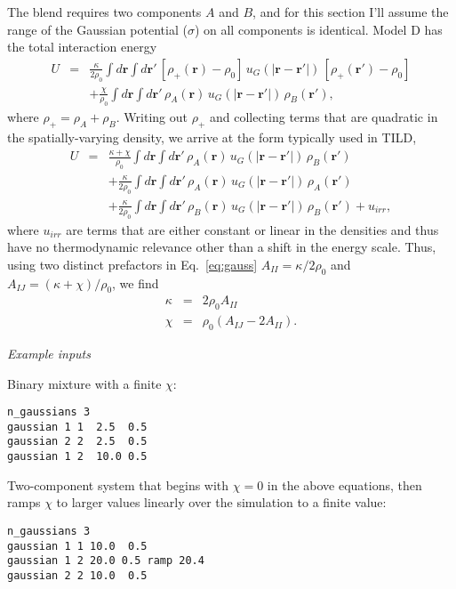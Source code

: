 \documentclass[12pt]{article}
\newcommand{\mb}{\mathbf}
\begin{document}
The blend requires two components $A$ and $B$, and for this section I'll assume the range of the Gaussian potential ($\sigma$) on all components is identical. Model D has the total interaction energy
\begin{eqnarray}
	U
	&=&
	\frac{\kappa}{2\rho_0}
	\int d \mb r
	\int d \mb r'
	\,
	[\rho_+(\mb r)-\rho_0] \, 
	u_G(|\mb r- \mb r'|)
	\,
	[\rho_+(\mb r')-\rho_0]
	\\
	\nonumber
	&&
	+
	\frac{ \chi } { \rho_0 }
	\int d\mb r
	\int d\mb r'
	\,
	\rho_A(\mb r)
	\,
	u_G(|\mb r - \mb r'|)
	\,
	\rho_B(\mb r'),
\end{eqnarray}
where $\rho_+ = \rho_A + \rho_B$. Writing out $\rho_+$ and collecting terms that are quadratic in the spatially-varying density, we arrive at the form typically used in TILD,
\begin{eqnarray}
	U &=&
	\frac{\kappa + \chi}{\rho_0} 
	\int d\mb r
	\int d\mb r'
	\,
	\rho_A(\mb r)
	\,
	u_G(|\mb r - \mb r'|)
	\,
	\rho_B(\mb r')
	\\
	&&
	\nonumber
	+
	\frac{\kappa}{2\rho_0} 
	\int d\mb r
	\int d\mb r'
	\,
	\rho_A(\mb r)
	\,
	u_G(|\mb r - \mb r'|)
	\,
	\rho_A(\mb r')
	\\
	&&
	\nonumber
	+
	\frac{\kappa}{2\rho_0} 
	\int d\mb r
	\int d\mb r'
	\,
	\rho_B(\mb r)
	\,
	u_G(|\mb r - \mb r'|)
	\,
	\rho_B(\mb r')
	+ u_{irr},
\end{eqnarray} 
where $u_{irr}$ are terms that are either constant or linear in the densities and thus have no thermodynamic relevance other than a shift in the energy scale. Thus, using two distinct prefactors in Eq.~\ref{eq:gauss} $A_{II} = \kappa/2\rho_0$ and $A_{IJ} = (\kappa + \chi)/\rho_0$, we find
\begin{eqnarray}
  \kappa &=& 2 \rho_0 A_{II}
  \\
  \chi &=& \rho_0 (A_{IJ} - 2 A_{II}).
\end{eqnarray}

{\it Example inputs}

Binary mixture with a finite $\chi$:
\begin{verbatim}
n_gaussians 3
gaussian 1 1  2.5  0.5
gaussian 2 2  2.5  0.5
gaussian 1 2  10.0 0.5
\end{verbatim}
Two-component system that begins with $\chi = 0$ in the above equations, then ramps $\chi$ to larger values linearly over the simulation to a finite value:
\begin{verbatim}
n_gaussians 3
gaussian 1 1 10.0  0.5
gaussian 1 2 20.0 0.5 ramp 20.4
gaussian 2 2 10.0  0.5
\end{verbatim}
\end{document}
